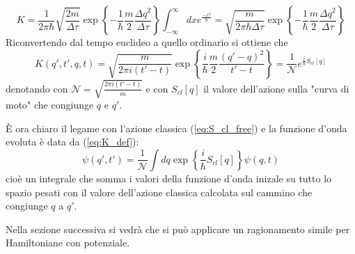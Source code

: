$$
K = \frac{1}{2\pi\hbar}\sqrt{\frac{2m}{\Delta\tau}}\exp\left\{-\frac{1}{\hbar}\frac{m}{2}\frac{\Delta q^2}
{\Delta\tau} \right\} \int_{-\infty}^{\infty}dx e^{\frac{-x^2}{\hbar}} = \sqrt{\frac{m}{2\pi\hbar\Delta\tau}}
\exp\left\{-\frac{1}{\hbar}\frac{m}{2}\frac{\Delta q^2}{\Delta\tau}\right\}
$$
Riconvertendo dal tempo euclideo a quello ordinario si ottiene che
\begin{equation}
K(q',t',q,t) = \sqrt{\frac{m}{2\pi i(t'-t)}}\exp\left\{\frac{i}{\hbar}\frac{m}{2}
\frac{(q'-q)^2}{t'-t}\right\} = \frac{1}{\mathcal{N}}e^{\frac{i}{\hbar}S_{cl}[q]}
\label{eq:K_free}
\end{equation}
denotando con $\mathcal{N} = \sqrt{\frac{2\pi i (t'-t)}{m}}$ e con $S_{cl}[q]$ il valore dell'azione
sulla "curva di moto" che congiunge $q$ e $q'$.

È ora chiaro il legame con l'azione classica (\ref{eq:S_cl_free}) e la funzione d'onda evoluta è
data da (\ref{eq:K_def}):
$$\psi(q',t') = \frac{1}{\mathcal{N}}\int dq \exp\left\{\frac{i}{\hbar}S_{cl}[q]\right\}\psi(q,t)$$
cioè un integrale che somma i valori della funzione d'onda inizale su tutto lo spazio pesati con
il valore dell'azione classica calcolata sul cammino che congiunge $q$ a $q'$.

Nella sezione successiva si vedrà che si può applicare un ragionamento simile per Hamiltoniane con
potenziale.
